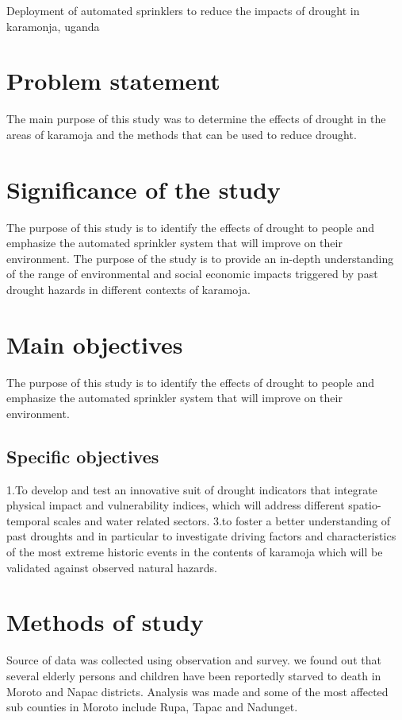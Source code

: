 \documentclass[11Spt,]{article}
\begin{document}
\newpage
\tableofcontents
\newpage
Deployment of automated sprinklers to reduce the impacts of drought in karamonja, uganda


\section{Problem statement}
The main purpose of this study was to determine the effects of drought in the areas of karamoja and the methods that can be used to reduce drought.
\section{Significance of the study}
The purpose of this study is to identify the effects of drought to people and emphasize the automated sprinkler system that will improve on their environment. 
	The purpose of the study is to provide an in-depth understanding of the range of environmental and social economic impacts triggered by past drought hazards in different contexts of karamoja.
\section{Main objectives}
The purpose of this study is to identify the effects of drought to people and emphasize the automated sprinkler system that will improve on their environment.
\subsection{Specific objectives}
1.To develop and test an innovative suit of drought indicators that integrate physical impact and vulnerability indices, which will address different spatio-temporal scales and water related sectors.
3.to foster a better understanding of past droughts and in particular to investigate driving factors and characteristics of the most extreme historic events in the contents of karamoja which will be validated against observed natural hazards.
\section{Methods of study}
Source of data was collected using observation and survey. we found out that several elderly persons and children have been reportedly starved to death in Moroto and Napac districts.
Analysis was made and some of the most affected sub counties in Moroto include Rupa, Tapac and Nadunget.
\end{document}
